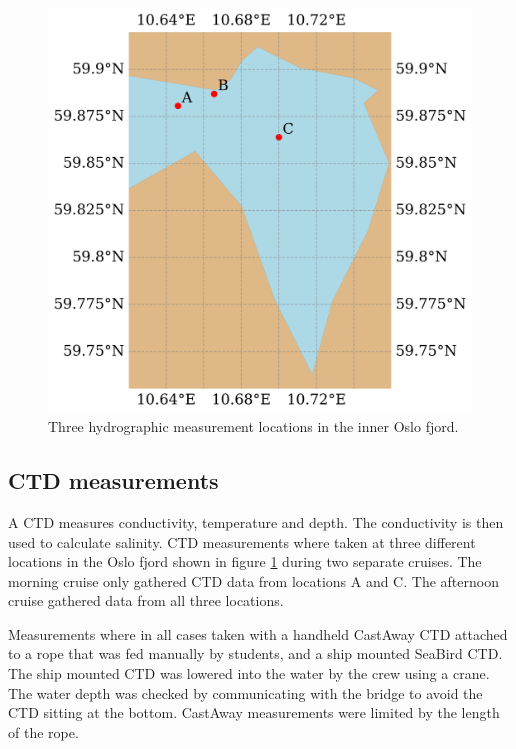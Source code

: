 \documentclass[a4paper,10pt,english]{article}
\begin{document}
\setlength{\intextsep}{-30pt}
\begin{figure}  %
        \centering
        \includegraphics[width=\linewidth]{../figures/station_map_3_stations.png}
        \caption{Three hydrographic measurement locations in the inner Oslo fjord.}
        \label{fig:map_ctd}
\end{figure}
\newpage
\subsection{CTD measurements}
A CTD measures conductivity, temperature and depth. The conductivity is then used to calculate salinity. CTD measurements where taken at three different locations in the Oslo fjord shown in figure \ref*{fig:map_ctd} during two separate cruises. The morning cruise only gathered CTD data from locations A and C. The afternoon cruise gathered data from all three locations. 

Measurements where in all cases taken with a handheld CastAway CTD attached to a rope that was fed manually by students, and a ship mounted SeaBird CTD. The ship mounted CTD was lowered into the water by the crew using a crane. The water depth was checked by communicating with the bridge to avoid the CTD sitting at the bottom. CastAway measurements were limited by the length of the rope.
\end{document}
